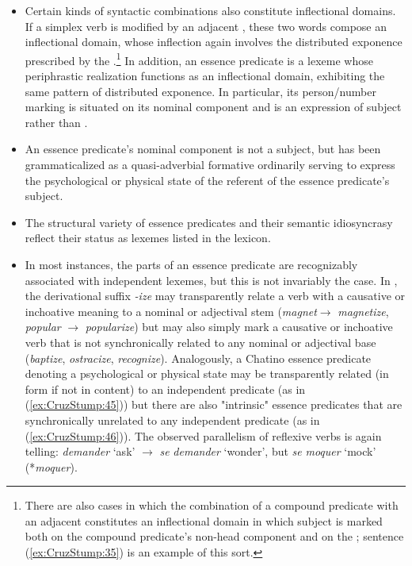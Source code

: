 \documentclass[output=paper]{langsci/langscibook}
\begin{document}
\begin{itemize}
\item Certain kinds of syntactic combinations also constitute inflectional domains.  If a simplex verb is modified by an adjacent , these two words compose an inflectional domain, whose inflection again involves the distributed exponence prescribed by the .\footnote{There are also cases in which the combination of a compound predicate with an adjacent  constitutes an inflectional domain in which subject  is marked both on the compound predicate's non-head component and on the ; sentence (\ref{ex:CruzStump:35}) is an example of this sort.}  In addition, an essence predicate is a lexeme whose periphrastic realization functions as an inflectional domain, exhibiting the same pattern of distributed exponence.  In particular, its person/number marking is situated on its nominal component and is an expression of subject  rather than .
\item An essence predicate's nominal component is not a subject, but has been grammaticalized as a quasi-adverbial formative ordinarily serving to express the psychological or physical state of the referent of the essence predicate's subject.
\item The structural variety of essence predicates and their semantic idiosyncrasy reflect their status as lexemes listed in the lexicon.
\item In most instances, the parts of an essence predicate are recognizably associated with independent lexemes, but this is not invariably the case.  In , the derivational suffix \textit{-ize} may transparently relate a verb with a causative or inchoative meaning to a nominal or adjectival stem (\textit{magnet}$\rightarrow$ \textit{magnetize}, \textit{popular} $\rightarrow$ \textit{popularize}) but may also simply mark a causative or inchoative verb that is not synchronically related to any nominal or adjectival base (\emph{baptize}, \emph{ostracize},
\textit{recognize}). Analogously, a Chatino essence predicate denoting a psychological or physical state may be transparently related (in form if not in content) to an independent predicate (as in (\ref{ex:CruzStump:45})) but there are also "intrinsic" essence predicates that are synchronically unrelated to any independent predicate (as in (\ref{ex:CruzStump:46})).  The observed parallelism of reflexive verbs is again telling: \emph{demander} `ask' $\rightarrow$ \emph{se} \emph{demander} `wonder', but \emph{se} \emph{moquer} `mock' (*\emph{moquer}).
\end{itemize}
\end{document}
